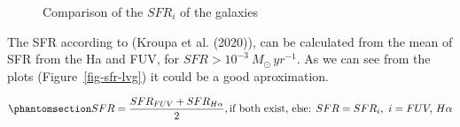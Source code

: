 \documentclass[
]{article}
\begin{document}
\begin{figure}


\caption{\label{fig-sfr-pairplot}Comparison of the \(SFR_{i}\) of the
galaxies}

\end{figure}%

The SFR according to (Kroupa et al. (2020)), can be calculated from the
mean of SFR from the Ha and FUV, for \(SFR>10^{-3}\ M_\odot\, yr^{-1}\).
As we can see from the plots (Figure~\ref{fig-sfr-lvg}) it could be a
good aproximation.

\begin{equation}\phantomsection\label{eq-sfr-mean}{
SFR = \frac{SFR_{FUV}+SFR_{H\alpha}}{2}, \text{if both exist, else: } SFR = SFR_i,\ i= FUV,\, H\alpha
}\end{equation}
\end{document}
